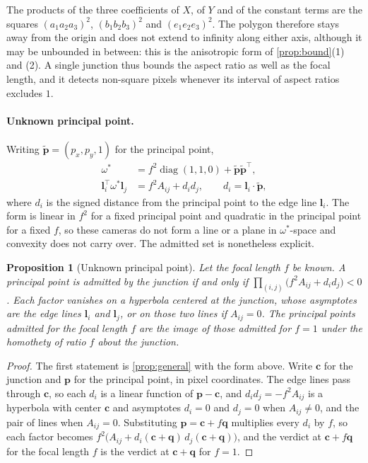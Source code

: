 \documentclass[pdflatex,sn-mathphys-num,iicol]{sn-jnl}
\newcommand{\vl}{\mathbf{l}}
\theoremstyle{thmstyleone}
\newtheorem{proposition}[theorem]{Proposition}
\theoremstyle{thmstylethree}
\theoremstyle{thmstyletwo}
\begin{document}
The products of the three coefficients of $X$, of $Y$ and of the constant terms are the squares $(a_1a_2a_3)^2$, $(b_1b_2b_3)^2$ and $(e_1e_2e_3)^2$. The polygon therefore stays away from the origin and does not extend to infinity along either axis, although it may be unbounded in between: this is the anisotropic form of \cref{prop:bound}(1) and (2). A single junction thus bounds the aspect ratio as well as the focal length, and it detects non-square pixels whenever its interval of aspect ratios excludes $1$.

\paragraph{Unknown principal point.} Writing $\tilde{\mathbf p}=(p_x,p_y,1)$ for the principal point,
\[
\begin{aligned}
\omega^{*}&=f^2\operatorname{diag}(1,1,0)+\tilde{\mathbf p}\tilde{\mathbf p}^{\top},\\
\vl_i^{\top}\omega^{*}\vl_j&=f^2A_{ij}+d_id_j,\qquad d_i=\vl_i\cdot\tilde{\mathbf p},
\end{aligned}
\]
where $d_i$ is the signed distance from the principal point to the edge line $\vl_i$. The form is linear in $f^2$ for a fixed principal point and quadratic in the principal point for a fixed $f$, so these cameras do not form a line or a plane in $\omega^{*}$-space and convexity does not carry over. The admitted set is nonetheless explicit.

\begin{proposition}[Unknown principal point]\label{prop:pp}
Let the focal length $f$ be known. A principal point is admitted by the junction if and only if $\prod_{(i,j)}\bigl(f^2A_{ij}+d_id_j\bigr)<0$. Each factor vanishes on a hyperbola centered at the junction, whose asymptotes are the edge lines $\vl_i$ and $\vl_j$, or on those two lines if $A_{ij}=0$. The principal points admitted for the focal length $f$ are the image of those admitted for $f=1$ under the homothety of ratio $f$ about the junction.
\end{proposition}
\begin{proof}
The first statement is \cref{prop:general} with the form above. Write $\mathbf c$ for the junction and $\mathbf p$ for the principal point, in pixel coordinates. The edge lines pass through $\mathbf c$, so each $d_i$ is a linear function of $\mathbf p-\mathbf c$, and $d_id_j=-f^2A_{ij}$ is a hyperbola with center $\mathbf c$ and asymptotes $d_i=0$ and $d_j=0$ when $A_{ij}\neq0$, and the pair of lines when $A_{ij}=0$. Substituting $\mathbf p=\mathbf c+f\mathbf q$ multiplies every $d_i$ by $f$, so each factor becomes $f^2\bigl(A_{ij}+d_i(\mathbf c+\mathbf q)\,d_j(\mathbf c+\mathbf q)\bigr)$, and the verdict at $\mathbf c+f\mathbf q$ for the focal length $f$ is the verdict at $\mathbf c+\mathbf q$ for $f=1$.
\end{proof}
\end{document}
